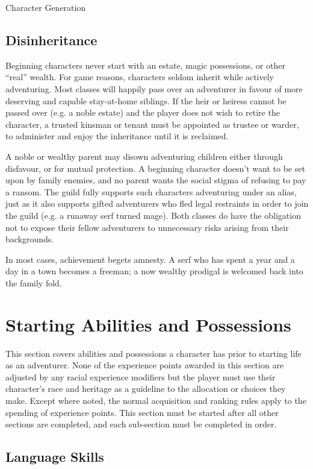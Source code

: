 \begin{Chapter}{Character Generation}
\subsection{Disinheritance}

Beginning characters never start with an estate, magic possessions, or
other “real” wealth.  For game reasons, characters seldom inherit
while actively adventuring.  Most classes will happily pass over an
adventurer in favour of more deserving and capable stay-at-home
siblings.  If the heir or heiress cannot be passed over (e.g. a noble
estate) and the player does not wish to retire the character, a
trusted kinsman or tenant must be appointed as trustee or warder, to
administer and enjoy the inheritance until it is reclaimed.

A noble or wealthy parent may disown adventuring children either
through disfavour, or for mutual protection.  A beginning character
doesn’t want to be set upon by family enemies, and no parent wants the
social stigma of refusing to pay a ransom.  The guild fully supports
such characters adventuring under an alias, just as it also supports
gifted adventurers who fled legal restraints in order to join the
guild (e.g. a runaway serf turned mage).  Both classes do have the
obligation not to expose their fellow adventurers to unnecessary risks
arising from their backgrounds.

In most cases, achievement begets amnesty.  A serf who has spent a
year and a day in a town becomes a freeman; a now wealthy prodigal is
welcomed back into the family fold.

\section{Starting Abilities and Possessions}

This section covers abilities and possessions a character has prior to
starting life as an adventurer.  None of the experience points awarded
in this section are adjusted by any racial experience modifiers but
the player must use their character’s race and heritage as a guideline
to the allocation or choices they make. Except where noted, the normal
acquisition and ranking rules apply to the spending of experience
points.  This section must be started after all other sections are
completed, and each sub-section must be completed in order.

\subsection{Language Skills}


\end{Chapter}
